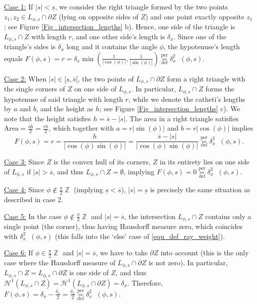 \documentclass[11pt,reqno]{amsart}
\DeclareMathOperator{\ZZ}{\mathbb{Z}}
\DeclareMathOperator{\RayWeight}{\omega^\mathrm{rd}_{\delta_\mathit{x}}}
\numberwithin{theorem}{section}
\theoremstyle{remark}
\begin{document}
\underline{Case 1:}
If $|s|<\underline s$, we consider the right triangle formed by the two points $z_1,z_2\in L_{\phi,s}\cap \partial Z$ (lying on opposite sides of $Z$) and one point exactly opposite $z_1$; see Figure \ref{Fig_intersection_lengths} b). Hence, one side of the triangle is $L_{\phi,s}\cap Z$ with length $r$, and one other side's length is $\delta_x$.
Since one of the triangle's sides is $\delta_x$ long and it contains the angle $\phi$, the hypotenuse's length equals $F(\phi,s)=r=\delta_x \min\left(\frac{1}{|\cos(\phi)|},\frac{1}{|\sin(\phi)|}\right)\overset{\text{per}}{\underset{\text{def}}{=}}\delta_x^2\RayWeight(\phi,s)$.

\underline{Case 2:}
When $|s|\in [\underline s,\overline s[$, the two points of $L_{\phi,s}\cap \partial Z$ form a right triangle with the single corners of $Z$ on one side of $L_{\phi,s}$. In particular, $L_{\phi,s}\cap Z$ forms the hypotenuse of said triangle with length $r$, while we denote the catheti's lengths by $a$ and $b$, and the height as $h$; see Figure \ref{Fig_intersection_lengths} c). We note that the height satisfies $h=\overline s -|s|$.
The area in a right triangle satisfies $\text{Area} = \frac{ab}{2} = \frac{rh}{2}$, which together with  $a=r|\sin(\phi)|$ and $b=r|\cos(\phi)|$  implies  
\begin{equation}
 F(\phi,s)= r = \frac{h}{|\cos(\phi)\sin(\phi)|}= \frac{\overline s -|s|}{|\cos(\phi)\sin(\phi)|}\overset{\text{per}}{\underset{\text{def}}{=}}\delta_x^2 \RayWeight(\phi,s).
\end{equation}


\underline{Case 3:}
Since $Z$ is the convex hull of its corners, $Z$ in its entirety lies on one side of $L_{\phi,s}$ if $|s|>\overline s$, and thus $L_{\phi,s}\cap Z=\emptyset$, implying $F(\phi,s)=0\overset{\text{per}}{\underset{\text{def}}{=}}\delta_x^2 \RayWeight(\phi,s)$.

\underline{Case 4:}
Since $\phi \not \in \frac{\pi}{2}\ZZ$ (implying $\underline{s}<\overline{s}$), $|s|=\underline s$ is precisely the same situation as described in case 2.

\underline{Case 5:}
In the case $\phi \not \in \frac{\pi}{2}\ZZ$ and $|s|=\overline s$, the intersection $L_{\phi,s}\cap Z$ contains only a single point (the corner), thus having Hausdorff measure zero, which coincides with $\delta_x^2\RayWeight(\phi,s)$ (this falls into the `else' case of \eqref{equ_def_ray_weight}).

\underline{Case 6:}
If $\phi \in \frac{\pi}{2}\ZZ$ and $|s|=\overline s$,  we have to take $\partial Z$ into account (this is the only case where the Hausdorff measure of $L_{\phi,s}\cap \partial Z$ is not zero). 
In particular, $L_{\phi,s}\cap Z=L_{\phi,s}\cap \partial Z$ is one side of $Z$, and thus $\mathcal{H}^1(L_{\phi,s}\cap Z)=\mathcal{H}^1(L_{\phi,s}\cap \partial Z)=\delta_x$. Therefore, $F(\phi,s)=\delta_x-\frac{\delta_x}{2}= \frac{\delta_x}{2}\overset{\text{per}}{\underset{\text{def}}{=}} \delta_x^2 \RayWeight(\phi,s)$.
\end{document}
